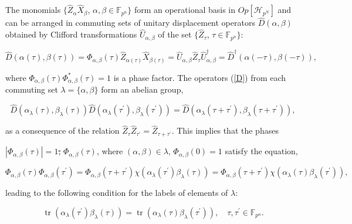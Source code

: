 \documentclass[quantumrep,article,submit,pdftex,moreauthors]{Definitions/mdpi}
\DeclareMathOperator{\tr}{tr}
\providecommand{\DIFdel}[1]{{\protect\color{red}\sout{#1}}}                      %
\providecommand{\DIFdelbegin}{} %
\providecommand{\DIFdelend}{} %
\begin{document}
The monomials $\{\hat{Z}_{\alpha}\hat{X}_{\beta}$, $\alpha,\beta \in
\mathbb{F}_{p^{n}}\}$ form an operational basis in $Op[\mathcal{H}_{p^{N}}]$
and
 can be arranged in commuting sets of unitary displacement operators
$\hat{D}(\alpha,\beta)$ obtained by Clifford transformations
$\hat{U}_{\alpha,\beta}$ of the set $\{\hat{Z}_{\tau}$, $\tau \in
\mathbb{F}_{p^{n}}\}$:

\begin{equation}
  \hat{D} \left( \alpha(\tau),\beta(\tau) \right)
  = \Phi_{\alpha,\beta} \left( \tau \right)
  \hat{Z}_{\alpha(\tau)}\hat{X}_{\beta(\tau)}
  = \hat{U}_{\alpha,\beta}\hat{Z}_{\tau}\hat{U}_{\alpha,\beta }^{\dagger}
  = \hat{D}^{\dagger} \left(\alpha(-\tau),\beta(-\tau)\right),
  \label{D}
\end{equation}

where $\Phi_{\alpha,\beta}\left( \tau \right) \Phi_{\alpha,\beta}^{\ast}\left(
\tau \right)=1$ is a phase factor. The operators (\ref{D}) from each commuting
set $\lambda=\{\alpha,\beta\}$ form an abelian group,

\begin{equation}
  \hat{D}\left( \alpha_{\lambda}(\tau),\beta_{\lambda }(\tau) \right)
  \hat{D}\left(
    \alpha_{\lambda}(\tau^{\prime}),\beta_{\lambda}(\tau^{\prime})
  \right)
  = \hat{D}\left(
    \alpha_{\lambda}(\tau + \tau^{\prime}),
    \beta_{\lambda}(\tau + \tau^{\prime} )
  \right),
  \label{DD}
\end{equation}

as a consequence of the relation $\hat{Z}_{\tau}\hat{Z}_{\tau^{\prime}} =
\hat{Z}_{\tau+\tau^{\prime}}$. This implies that the phases
 \DIFdelbegin
\DIFdel{$|\Phi _{\alpha ,\beta }\left( \tau \right) |=1$, }\DIFdelend
$\Phi_{\alpha,\beta}\left( \tau \right)$, where
$(\alpha,\beta )\in \lambda$,
 $\Phi_{\alpha,\beta}\left(0\right) =
1$ satisfy the equation,

\begin{equation}
  \Phi_{\alpha,\beta} \left( \tau \right)
  \Phi_{\alpha,\beta }\left(\tau^{\prime}\right)
  = \Phi_{\alpha,\beta}\left( \tau+\tau^{\prime}\right)
  \chi\left( \alpha_{\lambda}(\tau^{\prime})\beta_{\lambda}(\tau) \right)
  = \Phi_{\alpha,\beta}\left(\tau+\tau^{\prime}\right)
  \chi\left(\alpha_{\lambda}(\tau)\beta_{\lambda}(\tau^{\prime })\right),
  \label{Phi}
\end{equation}

leading to the following condition for the labels of elements of $\lambda$:

\begin{equation}
  \tr\left(\alpha_{\lambda}(\tau^{\prime})\beta_{\lambda }(\tau)\right)
  = \tr\left(\alpha_{\lambda}(\tau)\beta_{\lambda} (\tau^{\prime} )\right),
  \quad \tau,\tau^{\prime} \in \mathbb{F}_{p^{n}}.
  \label{CC}
\end{equation}
\end{document}
